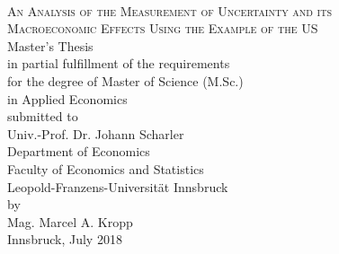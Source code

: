 \documentclass[a4paper,12pt,oneside,pointednumbers,bibtotoc,bigheadings,liststotoc]{scrbook}
\begin{document}
\begin{titlepage}
\begin{center}
        \HRule \\[2mm]
        \large {\scshape An Analysis of the Measurement of Uncertainty and its\\
        				Macroeconomic Effects Using the Example of the US} \\[10mm]
        \large Master's Thesis \\[10mm]
        \large in partial fulfillment of the requirements \\for the degree of Master of Science (M.Sc.)\\
                  in Applied Economics \\[10mm]
                  
        submitted to\\
        Univ.-Prof. Dr. Johann Scharler \\[10mm]
        Department of Economics\\
        Faculty of Economics and Statistics\\
        Leopold-Franzens-Universität Innsbruck \\[10mm]
        by \\ Mag. Marcel A. Kropp \\[10mm]
        Innsbruck, July 2018
    \end{center}
\end{titlepage}
\restoregeometry

\thispagestyle{empty} %
\null{}
    \begin{flushright}
    \end{flushright}
\null
\end{document}
